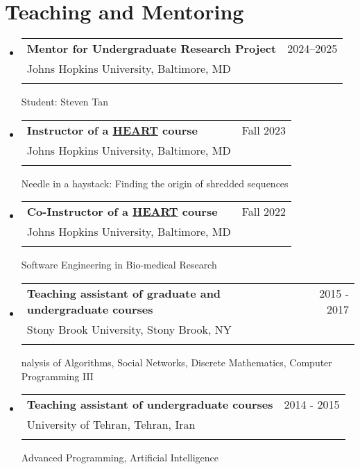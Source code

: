 \documentclass[A4,11pt]{article}
\makeatletter
\newcommand{\CVSubheading}[4]{
  \vspace{-2pt}\item
    \begin{tabular*}{0.97\textwidth}[t]{l@{\extracolsep{\fill}}r}
      \textbf{#1} & #2 \\
      \small#3 & \small #4 \\
    \end{tabular*}\vspace{-7pt}
}
\newcommand{\CVSubHeadingListStart}{\begin{itemize}[leftmargin=0.5cm, label={}]}
\newcommand{\CVSubHeadingListEnd}{\end{itemize}}
\makeatother
\begin{document}

\begin{comment}
    Section is here as it applied to my application for positions in academia. 
    Remember to tailor the resume for to the position.
\end{comment}

\section{Teaching and Mentoring}
      \CVSubHeadingListStart
      \CVSubheading
      {Mentor for Undergraduate Research Project}{2024--2025}
      {Johns Hopkins University, Baltimore, MD}\\
      {Student: Steven Tan}{}
      \CVSubheading
      {Instructor of a \href{https://engineering.jhu.edu/education/undergraduate-studies/heart-heroic-courses/}{HEART} course}{Fall 2023}
      {Johns Hopkins University, Baltimore, MD}\\
      {Needle in a haystack: Finding the origin of shredded sequences}

      \CVSubheading
      {Co-Instructor of a \href{https://engineering.jhu.edu/education/undergraduate-studies/heart-heroic-courses/}{HEART} course}{Fall 2022}
      {Johns Hopkins University, Baltimore, MD}\\
      {Software Engineering in Bio-medical Research}

      \CVSubheading
          {Teaching assistant of graduate and undergraduate courses}{2015 - 2017}
          {Stony Brook University, Stony Brook, NY} \\
          {nalysis of Algorithms, Social Networks, Discrete Mathematics, Computer Programming III}
        \CVSubheading
          {Teaching assistant of undergraduate courses}{2014 - 2015}
          {University of Tehran, Tehran, Iran}\\
          {Advanced Programming, Artificial Intelligence}
        \CVSubHeadingListEnd
      
\end{document}
